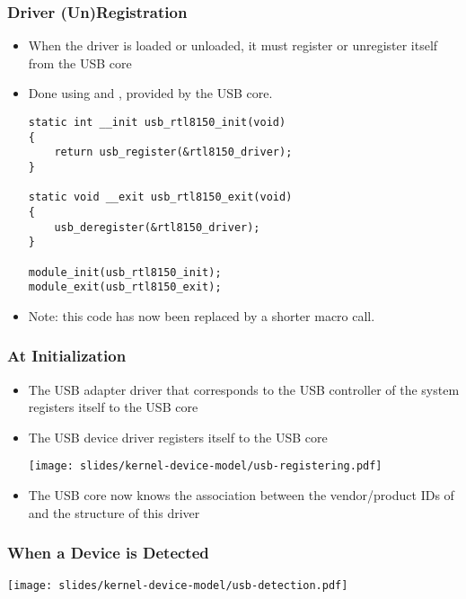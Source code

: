 \begin{frame}[fragile]
  \frametitle{Driver (Un)Registration}
  \begin{itemize}
  \item When the driver is loaded or unloaded, it must register or
    unregister itself from the USB core
  \item Done using  and ,
    provided by the USB core.
    \begin{block}{}
\begin{verbatim}
static int __init usb_rtl8150_init(void)
{
    return usb_register(&rtl8150_driver);
}

static void __exit usb_rtl8150_exit(void)
{
    usb_deregister(&rtl8150_driver);
}

module_init(usb_rtl8150_init);
module_exit(usb_rtl8150_exit);
\end{verbatim}
\end{block}
\item Note: this code has now been replaced by a shorter
   macro call.
  \end{itemize}
\end{frame}

\begin{frame}
  \frametitle{At Initialization}
  \begin{itemize}
  \item The USB adapter driver that corresponds to the USB controller
    of the system registers itself to the USB core
  \item The  USB device driver registers itself to the USB core
    \begin{center}
      \texttt{[image: slides/kernel-device-model/usb-registering.pdf]}
    \end{center}
  \item The USB core now knows the association between the
    vendor/product IDs of  and the  structure
    of this driver
  \end{itemize}
\end{frame}

\begin{frame}
  \frametitle{When a Device is Detected}
  \begin{center}
    \texttt{[image: slides/kernel-device-model/usb-detection.pdf]}
  \end{center}
\end{frame}

